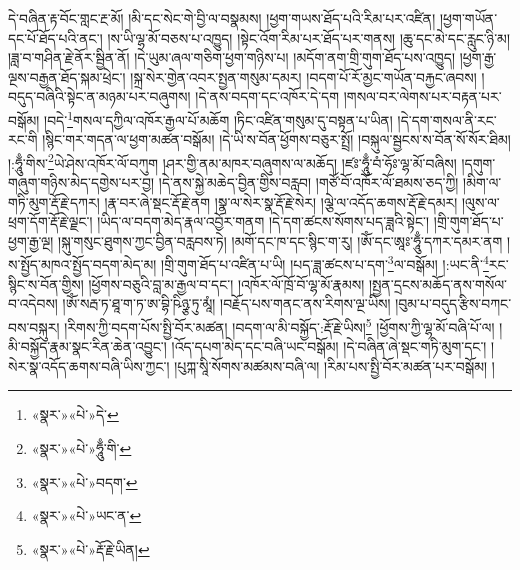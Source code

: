 དེ་བཞིན་རྟ་བོང་གླང་རྔ་མོ། །མི་དང་སེང་གེ་བྱི་ལ་བསྣམས། །ཕྱག་གཡས་ཐོད་པའི་རིམ་པར་འཛིན། །ཕྱག་གཡོན་དང་པོ་ཐོད་པའི་ནང་། །ས་ཡི་ལྷ་མོ་བཅས་པ་འཁྱུད། །སྟེང་འོག་རིམ་པར་ཐོད་པར་གནས། །ཆུ་དང་མེ་དང་རླུང་ཉི་མ། །ཟླ་བ་གཤིན་རྗེ་ནོར་སྦྱིན་ནོ། །དེ་ཡུམ་ཞལ་གཅིག་ཕྱག་གཉིས་པ། །མདོག་ནག་གྲི་གུག་ཐོད་པས་འཁྱུད། །ཕྱག་རྒྱ་ལྔས་བརྒྱན་ཐོད་སྐམ་ཕྲེང་། །སྐྲ་སེར་གྱེན་འབར་སྤྱན་གསུམ་དམར། །བདག་པོ་རོ་མྱང་གཡོན་བརྐྱང་ཞབས། །བདུད་བཞིའི་སྟེང་ན་མཉམ་པར་བཞུགས། །དེ་ནས་བདག་དང་འཁོར་དེ་དག །གསལ་བར་ལེགས་པར་བརྟན་པར་བསྒོམ། །བདེ་\footnote{«སྣར་»«པེ་»དེ་}གསལ་དཀྱིལ་འཁོར་རྒྱལ་པོ་མཆོག །ཏིང་འཛིན་གསུམ་དུ་བསྟན་པ་ཡིན། །དེ་དག་གསལ་ནི་རང་རང་གི །སྙིང་གར་གདན་ལ་ཕྱག་མཚན་བསྒོམ། །དེ་ཡི་ས་བོན་ཕྱོགས་བཅུར་སྤྲོ། །བསྐུལ་སྦྱངས་ས་བོན་སོ་སོར་ཐིམ། །:ཧཱུྃ་གིས་\footnote{«སྣར་»«པེ་»ཧཱུྃ་གི་}ཡེ་ཤེས་འཁོར་ལོ་བཀུག །ཤར་གྱི་ནམ་མཁར་བཞུགས་ལ་མཆོད། །ཛཿ་ཧཱུྃ་བཾ་ཧོཿ་ལྷ་མོ་བཞིས། །དགུག་གཞུག་གཉིས་མེད་དགྱེས་པར་བྱ། །དེ་ནས་སྐྱེ་མཆེད་བྱིན་གྱིས་བརླབ། །གཙོ་བོ་འཁོར་ལོ་ཐམས་ཅད་ཀྱི། །མིག་ལ་གཏི་མུག་རྡོ་རྗེ་དཀར། །རྣ་བར་ཞེ་སྡང་རྡོ་རྗེ་ནག །སྣ་ལ་སེར་སྣ་རྡོ་རྗེ་སེར། །ལྕེ་ལ་འདོད་ཆགས་རྡོ་རྗེ་དམར། །ལུས་ལ་ཕྲག་དོག་རྡོ་རྗེ་ལྗང་། །ཡིད་ལ་བདག་མེད་རྣལ་འབྱོར་གནག །དེ་དག་ཚངས་སོགས་པད་ཟླའི་སྟེང་། །གྲི་གུག་ཐོད་པ་ཕྱག་རྒྱ་ལྔ། །སྐུ་གསུང་ཐུགས་ཀྱང་བྱིན་བརླབས་ཏེ། །མགོ་དང་ཁ་དང་སྙིང་ག་རུ། །ཨོཾ་དང་ཨཱཿ་ཧཱུྃ་དཀར་དམར་ནག །ས་སྤྱོད་མཁའ་སྤྱོད་བདག་མེད་མ། །གྲི་གུག་ཐོད་པ་འཛིན་པ་ཡི། །པད་ཟླ་ཚངས་པ་དག་\footnote{«སྣར་»«པེ་»བདག་}ལ་བསྒོམ། །:ཡང་ནི་\footnote{«སྣར་»«པེ་»ཡང་ན་}རང་སྙིང་ས་བོན་གྱིས། །ཕྱོགས་བཅུའི་བླ་མ་རྒྱལ་བ་དང་། །འཁོར་ལོ་ཁྲོ་བོ་ལྷ་མོ་རྣམས། །སྤྱན་དྲངས་མཆོད་ནས་གསོལ་བ་འདེབས། །ཨོཾ་སརྦ་ཏ་ཐཱ་ག་ཏ་ཨ་བྷི་ཥིཉྩ་ཏུ་མཱཾ། །བརྗོད་པས་གནང་ནས་རིགས་ལྔ་ཡིས། །བུམ་པ་བདུད་རྩིས་བཀང་བས་བསྐུར། །རིགས་ཀྱི་བདག་པོས་སྤྱི་བོར་མཚན། །བདག་ལ་མི་བསྐྱོད་:རྡོ་རྗེ་ཡིས།\footnote{«སྣར་»«པེ་»རྡོ་རྗེ་ཡིན།} །ཕྱོགས་ཀྱི་ལྷ་མོ་བཞི་པོ་ལ། །མི་བསྐྱོད་རྣམ་སྣང་རིན་ཆེན་འབྱུང་། །འོད་དཔག་མེད་དང་བཞི་ཡང་བསྒོམ། །དེ་བཞིན་ཞེ་སྡང་གཏི་མུག་དང་། །སེར་སྣ་འདོད་ཆགས་བཞི་ཡིས་ཀྱང་། །པུཀྐ་སཱི་སོགས་མཚམས་བཞི་ལ། །རིམ་པས་སྤྱི་བོར་མཚན་པར་བསྒོམ། །
